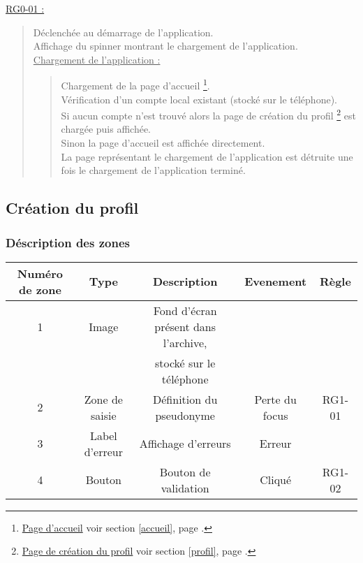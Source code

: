 \documentclass{report}
\begin{document}
		\underline{RG0-01 :}
		\begin{quote}
			Déclenchée au démarrage de l'application.\\
			Affichage du spinner montrant le chargement de l'application.\\
			\underline{Chargement de l'application :}
				\begin{quote}
					Chargement de la page d'accueil%
					\footnote[1]{
						\hyperlink{Page d'accueil}{Page d'accueil}
						\og voir section \ref{accueil}, page \pageref{accueil}.\fg
					}.\\
					Vérification d'un compte local existant (stocké sur le téléphone).\\
					Si aucun compte n'est trouvé alors la page de création du profil%
					\footnote[2]{
						\hyperlink{Création du profil}{Page de création du profil}
						\og voir section \ref{profil}, page \pageref{profil}.\fg
					}
					est chargée puis affichée.\\
					Sinon la page d'accueil%
					\footnotemark[1]
					est affichée directement. \\
					La page représentant le chargement de l'application est détruite une fois le chargement de l'application terminé.\\
				\end{quote}
		\end{quote}

	
\newpage

	\subsection{Création du profil}
		\hypertarget{Création du profil}{}
		\label{profil}
	
		

		\subsubsection{Déscription des zones}
				
			\begin{tabular}{|c|c|c|c|c|} \hline
				Numéro de zone & Type  & Description & Evenement &	Règle \\\hline 
				1 & Image & Fond d'écran présent dans l'archive, &  &\\\ 
				  &       & stocké sur le téléphone              &	&\\\hline
				2 & Zone de saisie & Définition du pseudonyme & Perte du focus & RG1-01 \\\hline
				3 & Label d'erreur & Affichage d'erreurs      & Erreur         &  \\\hline
				4 & Bouton         & Bouton de validation     & Cliqué & RG1-02 \\\hline
			\end{tabular}
\end{document}
